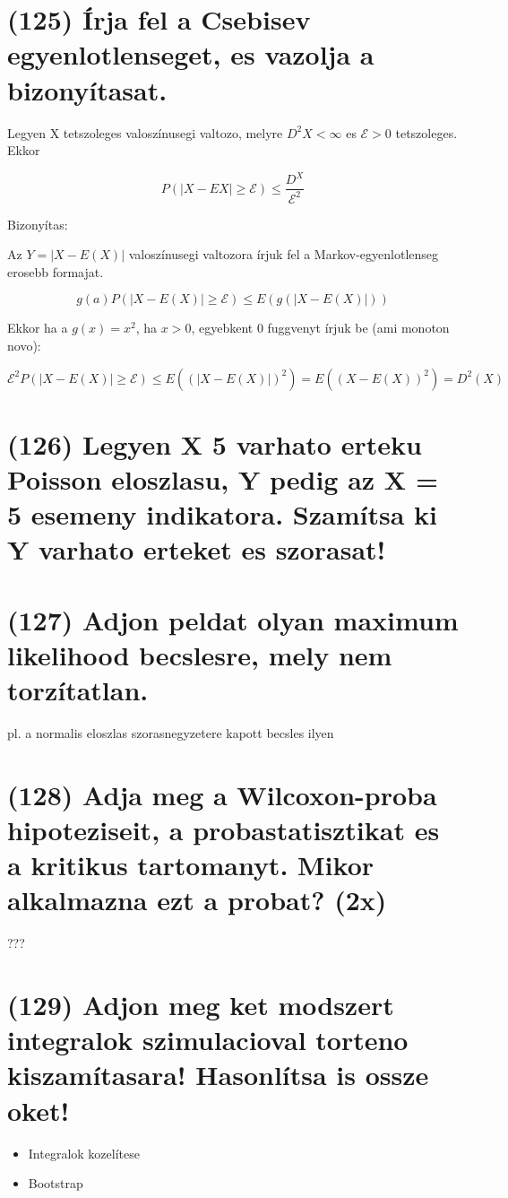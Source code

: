 \documentclass[12p]{article}
\begin{document}
\section{(125) Írja fel a Csebisev egyenlotlenseget, es vazolja a bizonyítasat.}

Legyen X tetszoleges valoszínusegi valtozo, melyre $D^2X < \infty$ es $\mathcal{E} > 0$ tetszoleges. Ekkor

$$P(|X - EX| \geq \mathcal{E}) \leq \frac{D^X}{\mathcal{E}^2}$$

Bizonyítas:

Az $Y = |X - E(X)|$ valoszínusegi valtozora írjuk fel a Markov-egyenlotlenseg erosebb formajat.

$$g(a)P(|X - E(X)| \geq \mathcal{E}) \leq E(g(|X - E(X)|))$$

Ekkor ha a $g(x) = x^2$, ha $x > 0$, egyebkent 0 fuggvenyt írjuk be (ami monoton novo):

$$\mathcal{E}^2P(|X - E(X)| \geq \mathcal{E}) \leq E((|X - E(X)|)^2) = E((X - E(X))^2) = D^2(X)$$

\section{(126) Legyen X 5 varhato erteku Poisson eloszlasu, Y pedig az X = 5 esemeny indikatora. Szamítsa ki Y varhato erteket es szorasat!}

\section{(127) Adjon peldat olyan maximum likelihood becslesre, mely nem torzítatlan.}

pl. a normalis eloszlas szorasnegyzetere kapott becsles ilyen

\section{(128) Adja meg a Wilcoxon-proba hipoteziseit, a probastatisztikat es a kritikus tartomanyt.
Mikor alkalmazna ezt a probat? (2x)}

???

\section{(129) Adjon meg ket modszert integralok szimulacioval torteno kiszamítasara! Hasonlítsa is
ossze oket!}

\begin{itemize}
\item Integralok kozelítese
\item Bootstrap
\end{itemize}
\end{document}
